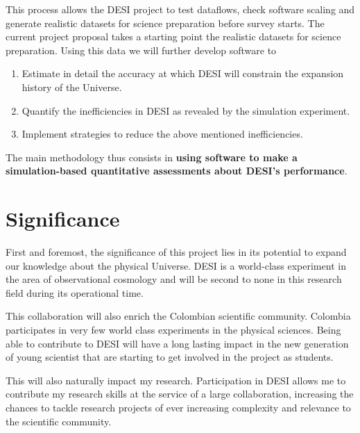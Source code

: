 \documentclass[12pt]{article}
\begin{document}
This process allows the DESI project to test dataflows, check software
scaling  and generate realistic datasets for science preparation before
survey starts. The current project proposal takes a starting point the
realistic datasets for science preparation. Using this data we will
further develop software to  
\begin{enumerate}
\item Estimate in detail the accuracy at which DESI will constrain the
  expansion history of the Universe.
\item Quantify the inefficiencies in DESI as revealed by the
  simulation experiment.
\item Implement strategies to reduce the above mentioned inefficiencies. 
\end{enumerate}

The main methodology thus consists in {\bf using software to make a
simulation-based quantitative assessments about DESI's performance}. 

\section*{Significance}

First and foremost, the significance of this project lies in its
potential to expand our knowledge about the physical Universe. DESI is
a world-class experiment in the area of observational cosmology and
will be second to none in this research field during its operational
time.  
 

This collaboration will also enrich the Colombian scientific
community. Colombia participates in very few world class experiments
in the physical sciences. Being able to contribute to DESI will have a
long lasting impact in the new generation of young scientist that are
starting to get involved in the project as students.

This will also naturally impact my research. Participation in DESI
allows me to contribute my research skills at the service of a large
collaboration, increasing the chances to tackle research projects of
ever increasing complexity and relevance to the scientific community.  
\end{document}
